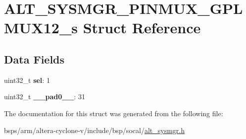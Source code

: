 \hypertarget{structALT__SYSMGR__PINMUX__GPLMUX12__s}{}\section{A\+L\+T\+\_\+\+S\+Y\+S\+M\+G\+R\+\_\+\+P\+I\+N\+M\+U\+X\+\_\+\+G\+P\+L\+M\+U\+X12\+\_\+s Struct Reference}
\label{structALT__SYSMGR__PINMUX__GPLMUX12__s}
\subsection*{Data Fields}
\begin{DoxyCompactItemize}
\item 
\mbox{\label{structALT__SYSMGR__PINMUX__GPLMUX12__s_a2a988d2cc54708b98a432c1f40300357}} 
uint32\+\_\+t {\bfseries sel}\+: 1
\item 
\mbox{\label{structALT__SYSMGR__PINMUX__GPLMUX12__s_a0696e09b1c0e1996a8cbecf46b300db5}} 
uint32\+\_\+t {\bfseries \+\_\+\+\_\+pad0\+\_\+\+\_\+}\+: 31
\end{DoxyCompactItemize}


The documentation for this struct was generated from the following file\+:\begin{DoxyCompactItemize}
\item 
bsps/arm/altera-\/cyclone-\/v/include/bsp/socal/\mbox{\hyperlink{alt__sysmgr_8h}{alt\+\_\+sysmgr.\+h}}\end{DoxyCompactItemize}
